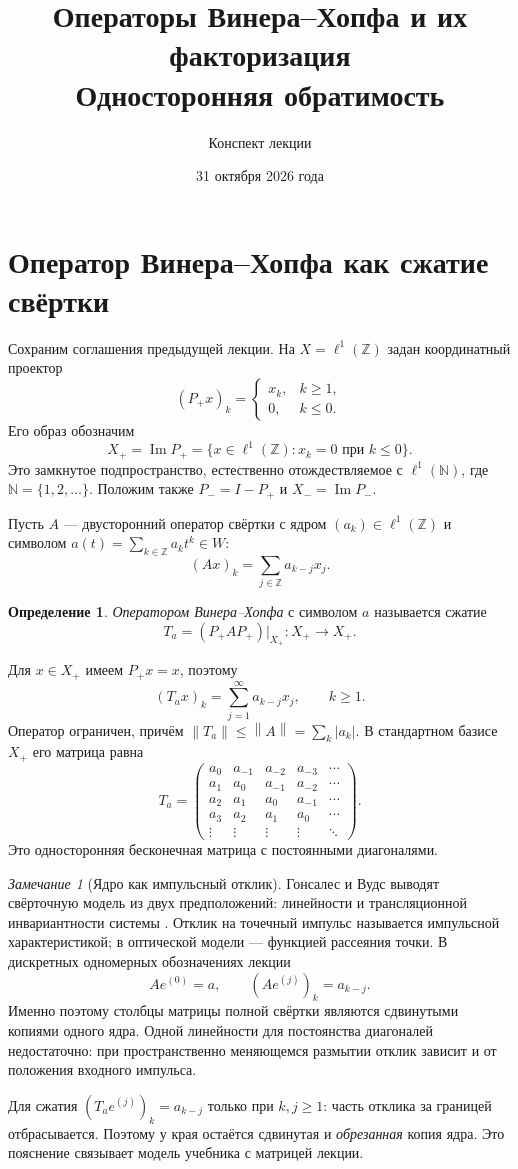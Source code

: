 \documentclass[12pt,a4paper]{article}
\title{Операторы Винера--Хопфа и их факторизация\\Односторонняя обратимость}
\author{Конспект лекции}
\date{31 октября 2026 года}
\theoremstyle{definition}
\newtheorem{definition}{Определение}
\theoremstyle{remark}
\newtheorem*{remark}{Замечание}
\newcommand{\ZZ}{\mathbb{Z}}
\newcommand{\norm}[1]{\left\lVert #1\right\rVert}
\begin{document}
\maketitle

\section{Оператор Винера--Хопфа как сжатие свёртки}

Сохраним соглашения предыдущей лекции. На $X=\ell^1(\ZZ)$ задан
координатный проектор
\[
  (P_+x)_k=\begin{cases}x_k,&k\geqslant1,\\0,&k\leqslant0.\end{cases}
\]
Его образ обозначим
\[
  X_+=\operatorname{Im}P_+
  =\{x\in\ell^1(\ZZ):x_k=0\text{ при }k\leqslant0\}.
\]
Это замкнутое подпространство, естественно отождествляемое с
$\ell^1(\mathbb N)$, где $\mathbb N=\{1,2,\ldots\}$.
Положим также $P_-=I-P_+$ и $X_-=\operatorname{Im}P_-$.

Пусть $A$ --- двусторонний оператор свёртки с ядром
$(a_k)\in\ell^1(\ZZ)$ и символом $a(t)=\sum_{k\in\ZZ}a_kt^k\in W$:
\[
  (Ax)_k=\sum_{j\in\ZZ}a_{k-j}x_j.
\]

\begin{definition}
\emph{Оператором Винера--Хопфа} с символом $a$ называется сжатие
\[
  \boxed{T_a=(P_+AP_+)\big|_{X_+}\colon X_+\longrightarrow X_+}.
\]
\end{definition}

Для $x\in X_+$ имеем $P_+x=x$, поэтому
\[
  (T_ax)_k=\sum_{j=1}^{\infty}a_{k-j}x_j,\qquad k\geqslant1.
\]
Оператор ограничен, причём $\norm{T_a}\leqslant\norm{A}
=\sum_k|a_k|$. В стандартном базисе $X_+$ его матрица равна
\[
  T_a=\begin{pmatrix}
    a_0&a_{-1}&a_{-2}&a_{-3}&\cdots\\
    a_1&a_0&a_{-1}&a_{-2}&\cdots\\
    a_2&a_1&a_0&a_{-1}&\cdots\\
    a_3&a_2&a_1&a_0&\cdots\\
    \vdots&\vdots&\vdots&\vdots&\ddots
  \end{pmatrix}.
\]
Это односторонняя бесконечная матрица с постоянными диагоналями.

\begin{remark}[Ядро как импульсный отклик]
Гонсалес и Вудс выводят свёрточную модель из двух предположений:
линейности и трансляционной инвариантности системы
\cite[\S\,5.5, с.~403--406]{GW2012}.
Отклик на точечный импульс называется импульсной характеристикой;
в оптической модели --- функцией рассеяния точки.
В дискретных одномерных обозначениях лекции
\[
  Ae^{(0)}=a,\qquad (Ae^{(j)})_k=a_{k-j}.
\]
Именно поэтому столбцы матрицы полной свёртки являются сдвинутыми
копиями одного ядра. Одной линейности для постоянства диагоналей
недостаточно: при пространственно меняющемся размытии отклик
зависит и от положения входного импульса.

Для сжатия $(T_ae^{(j)})_k=a_{k-j}$ только при $k,j\geqslant1$:
часть отклика за границей отбрасывается. Поэтому у края остаётся
сдвинутая и \emph{обрезанная} копия ядра. Это пояснение связывает
модель учебника с матрицей лекции.
\end{remark}
\end{document}
